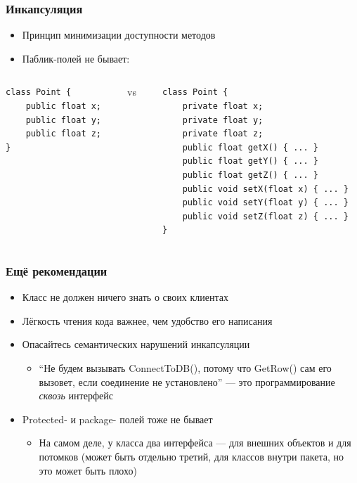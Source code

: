 \documentclass[xetex,mathserif,serif]{beamer}
\begin{document}
	\begin{frame}[fragile]
		\frametitle{Инкапсуляция}
		\begin{itemize}
			\item Принцип минимизации доступности методов
			\item Паблик-полей не бывает:
		\end{itemize}
		\begin{columns}
			\begin{column}{0.25\textwidth}
				\begin{verbatim}
class Point {
    public float x;
    public float y;
    public float z;
}
				\end{verbatim}
			\end{column}
			\begin{column}{0.1\textwidth}
				vs
			\end{column}
			\begin{column}{0.5\textwidth}
				\begin{verbatim}
class Point {
    private float x;
    private float y;
    private float z;
    public float getX() { ... }
    public float getY() { ... }
    public float getZ() { ... }
    public void setX(float x) { ... }
    public void setY(float y) { ... }
    public void setZ(float z) { ... }
}
				\end{verbatim}
			\end{column}
		\end{columns}
	\end{frame}

	\begin{frame}
		\frametitle{Ещё рекомендации}
		\begin{itemize}
			\item Класс не должен ничего знать о своих клиентах
			\item Лёгкость чтения кода важнее, чем удобство его написания
			\item Опасайтесь семантических нарушений инкапсуляции
			\begin{itemize}
				\item ``Не будем вызывать ConnectToDB(), потому что GetRow() сам его вызовет, если соединение не установлено'' --- это программирование \textit{сквозь} интерфейс
			\end{itemize}
			\item Protected- и package- полей тоже не бывает
			\begin{itemize}
				\item На самом деле, у класса два интерфейса --- для внешних объектов и для потомков (может быть отдельно третий, для классов внутри пакета, но это может быть плохо)
			\end{itemize}
		\end{itemize}
	\end{frame}
\end{document}
